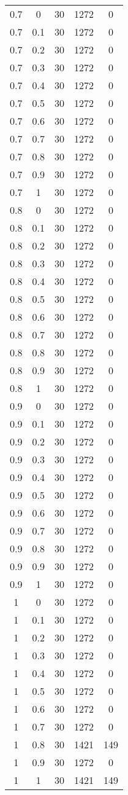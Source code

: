 \begin{longtable}{|c|c|c|c|c|}
	0.7& 0& 30& 1272& 0\\
	0.7& 0.1& 30& 1272& 0\\
	0.7& 0.2& 30& 1272& 0\\
	0.7& 0.3& 30& 1272& 0\\
	0.7& 0.4& 30& 1272& 0\\
	0.7& 0.5& 30& 1272& 0\\
	0.7& 0.6& 30& 1272& 0\\
	0.7& 0.7& 30& 1272& 0\\
	0.7& 0.8& 30& 1272& 0\\
	0.7& 0.9& 30& 1272& 0\\
	0.7& 1& 30& 1272& 0\\
	\hline
	
	0.8& 0& 30& 1272& 0\\
	0.8& 0.1& 30& 1272& 0\\
	0.8& 0.2& 30& 1272& 0\\
	0.8& 0.3& 30& 1272& 0\\
	0.8& 0.4& 30& 1272& 0\\
	0.8& 0.5& 30& 1272& 0\\
	0.8& 0.6& 30& 1272& 0\\
	0.8& 0.7& 30& 1272& 0\\
	0.8& 0.8& 30& 1272& 0\\
	0.8& 0.9& 30& 1272& 0\\
	0.8& 1& 30& 1272& 0\\
	\hline
	
	0.9& 0& 30& 1272& 0\\
	0.9& 0.1& 30& 1272& 0\\
	0.9& 0.2& 30& 1272& 0\\
	0.9& 0.3& 30& 1272& 0\\
	0.9& 0.4& 30& 1272& 0\\
	0.9& 0.5& 30& 1272& 0\\
	0.9& 0.6& 30& 1272& 0\\
	0.9& 0.7& 30& 1272& 0\\
	0.9& 0.8& 30& 1272& 0\\
	0.9& 0.9& 30& 1272& 0\\
	0.9& 1& 30& 1272& 0\\
	\hline
	
	1& 0& 30& 1272& 0\\
	1& 0.1& 30& 1272& 0\\
	1& 0.2& 30& 1272& 0\\
	1& 0.3& 30& 1272& 0\\
	1& 0.4& 30& 1272& 0\\
	1& 0.5& 30& 1272& 0\\
	1& 0.6& 30& 1272& 0\\
	1& 0.7& 30& 1272& 0\\
	1& 0.8& 30& 1421& 149\\
	1& 0.9& 30& 1272& 0\\
	1& 1& 30& 1421& 149\\

\end{longtable}

